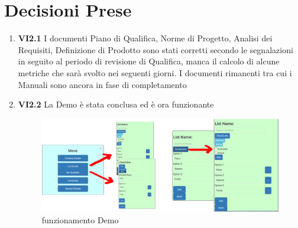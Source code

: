 \documentclass[10 pt,a4paper, openany]{article}
\begin{document}
\section{Decisioni Prese}
\begin{enumerate}
	\item \textbf{VI2.1} I documenti Piano di Qualifica, Norme di Progetto, Analisi dei Requisiti, Definizione di Prodotto sono stati corretti secondo le segnalazioni in seguito al periodo di revisione di Qualifica, manca il calcolo di alcune metriche che sarà svolto nei seguenti giorni.
	I documenti rimanenti tra cui i Manuali sono ancora in fase di completamento
	\item \textbf{VI2.2} La Demo è stata conclusa ed è ora funzionante
	
			\FloatBarrier
			\begin{figure}[ht]
				\centering
				\includegraphics[scale=0.20]{img/demo.png}
				\caption{funzionamento Demo}
			\end{figure}
	

\end{enumerate}
\end{document}
